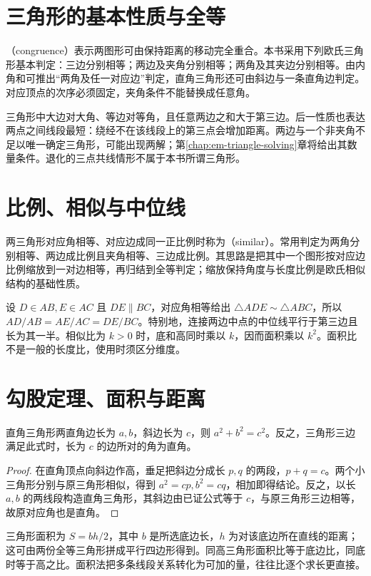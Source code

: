 \documentclass[UTF8]{ctexbook}
\begin{document}
\section{三角形的基本性质与全等}
（congruence）表示两图形可由保持距离的移动完全重合。本书采用下列欧氏三角形基本判定：三边分别相等；两边及夹角分别相等；两角及其夹边分别相等。由内角和可推出“两角及任一对应边”判定，直角三角形还可由斜边与一条直角边判定。对应顶点的次序必须固定，夹角条件不能替换成任意角。

三角形中大边对大角、等边对等角，且任意两边之和大于第三边。后一性质也表达两点之间线段最短：绕经不在该线段上的第三点会增加距离。两边与一个非夹角不足以唯一确定三角形，可能出现两解；第\ref{chap:em-triangle-solving}章将给出其数量条件。退化的三点共线情形不属于本书所谓三角形。

\section{比例、相似与中位线}
两三角形对应角相等、对应边成同一正比例时称为（similar）。常用判定为两角分别相等、两边成比例且夹角相等、三边成比例。其思路是把其中一个图形按对应边比例缩放到一对边相等，再归结到全等判定；缩放保持角度与长度比例是欧氏相似结构的基础性质。

设 $D\in AB,E\in AC$ 且 $DE\parallel BC$，对应角相等给出 $\triangle ADE\sim\triangle ABC$，所以 $AD/AB=AE/AC=DE/BC$。特别地，连接两边中点的中位线平行于第三边且长为其一半。相似比为 $k>0$ 时，底和高同时乘以 $k$，因而面积乘以 $k^2$。面积比不是一般的长度比，使用时须区分维度。

\section{勾股定理、面积与距离}
\begin{theorem}[勾股定理及逆定理]
直角三角形两直角边长为 $a,b$，斜边长为 $c$，则 $a^2+b^2=c^2$。反之，三角形三边满足此式时，长为 $c$ 的边所对的角为直角。
\end{theorem}
\begin{proof}
在直角顶点向斜边作高，垂足把斜边分成长 $p,q$ 的两段，$p+q=c$。两个小三角形分别与原三角形相似，得到 $a^2=cp,b^2=cq$，相加即得结论。反之，以长 $a,b$ 的两线段构造直角三角形，其斜边由已证公式等于 $c$，与原三角形三边相等，故原对应角也是直角。
\end{proof}
三角形面积为 $S=bh/2$，其中 $b$ 是所选底边长，$h$ 为对该底边所在直线的距离；这可由两份全等三角形拼成平行四边形得到。同高三角形面积比等于底边比，同底时等于高之比。面积法把多条线段关系转化为可加的量，往往比逐个求长更直接。
\end{document}
